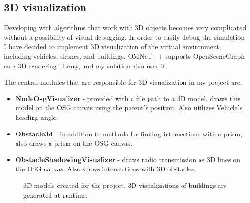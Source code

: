 \documentclass[]{nsm-thesis}
\begin{document}
\subsection{3D visualization}

Developing with algorithms that work with 3D objects becomes very complicated without a possibility of visual debugging. In order to easily debug the simulation I have decided to implement 3D visualization of the virtual environment, including vehicles, drones, and buildings. OMNeT++ supports OpenSceneGraph as a 3D rendering library, and my solution also uses it. 

The central modules that are responsible for 3D visualization in my project are: 

\begin{itemize}

\item \textbf{NodeOsgVisualizer} - provided with a file path to a 3D model, draws this model on the \ac{OSG} canvas using the parent's position. Also utilizes Vehicle's heading angle. 

\item \textbf{Obstacle3d} - in addition to methods for finding intersections with a prism, also draws a prism on the \ac{OSG} canvas.

\item \textbf{ObstacleShadowingVisualizer} - draws radio transmission as 3D lines on the \ac{OSG} canvas. Also shows intersections with 3D obstacles. 

\end{itemize}

\begin{figure}%
    \centering
    \caption{3D models created for the project. 3D visualizations of buildings are generated at runtime.}%
    \label{fig:3dmodels}%
\end{figure}
\end{document}
